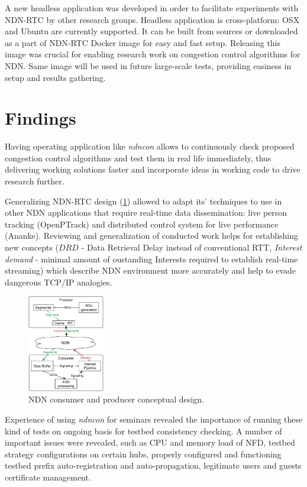 \documentclass{article}
\newcommand{\ndnconName}{\emph{ndncon}}
\begin{document}
A new headless application was developed in order to facilitate experiments with NDN-RTC by other research groups. Headless application is cross-platform: OSX and Ubuntu are currently supported. It can be built from sources or downloaded as a part of NDN-RTC Docker image for easy and fast setup. Releasing this image was crucial for enabling research work on congestion control algorithms for NDN. Same image will be used in future large-scale tests, providing easiness in setup and results gathering.

\section{Findings}

Having operating application like \ndnconName{} allows to continuously check proposed congestion control algorithms and test them in real life immediately, thus delivering working solutions faster and incorporate ideas in working code to drive research further.

Generalizing NDN-RTC design (\ref{fig:consumer-producer}) allowed to adapt its' techniques to use in other NDN applications that require real-time data dissemination: live person tracking (OpenPTrack) and distributed control system for live performance (Ananke). Reviewing and generalization of conducted work helps for establishing new concepts ($DRD$ - Data Retrieval Delay instead of conventional RTT, \textit{Interest demand} - minimal amount of oustanding Interests required to establish real-time streaming) which describe NDN environment more accurately and help to evade dangerous TCP/IP analogies.

\begin{figure}[t!]
\centering
\includegraphics[width=0.3\textwidth]{consumer-producer-general}
\caption{NDN consumer and producer conceptual design.}
\label{fig:consumer-producer}
\end{figure}

Experience of using \ndnconName{} for seminars revealed the importance of running these kind of tests on ongoing basis for testbed consistency checking. A number of important issues were revealed, such as CPU and memory load of NFD, testbed strategy configurations on certain hubs, properly configured and functioning testbed prefix auto-registration and auto-propagation, legitimate users and guests certificate management.
\end{document}
